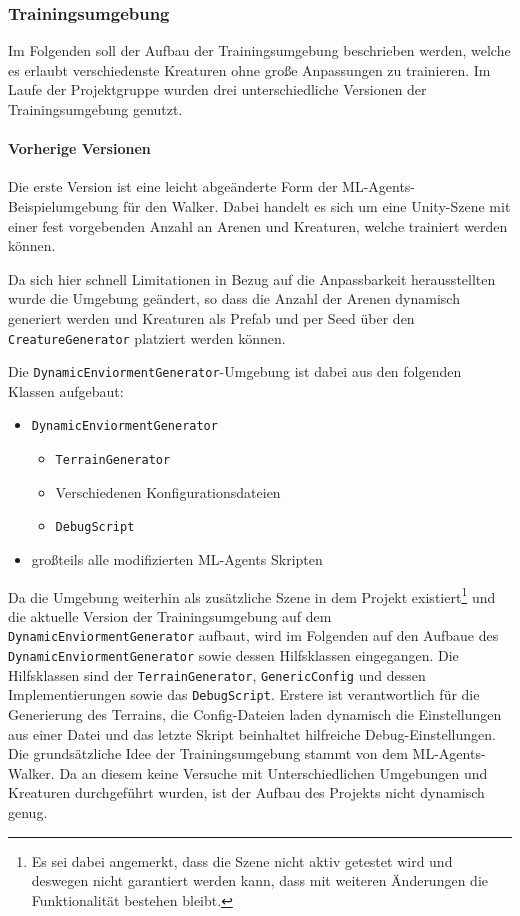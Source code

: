 \subsubsection{Trainingsumgebung}
Im Folgenden soll der Aufbau der Trainingsumgebung beschrieben werden, welche es erlaubt verschiedenste Kreaturen ohne große Anpassungen zu trainieren. Im Laufe der Projektgruppe wurden drei unterschiedliche Versionen der Trainingsumgebung genutzt. 

\paragraph{Vorherige Versionen}
Die erste Version ist eine leicht abgeänderte Form der ML-Agents-Beispielumgebung für den Walker. Dabei handelt es sich um eine Unity-Szene mit einer fest vorgebenden Anzahl an Arenen und Kreaturen, welche trainiert werden können.

Da sich hier schnell Limitationen in Bezug auf die Anpassbarkeit herausstellten wurde die Umgebung geändert, so dass die Anzahl der Arenen dynamisch generiert werden und Kreaturen als Prefab und per Seed über den \texttt{CreatureGenerator} platziert werden können. 

Die  \texttt{DynamicEnviormentGenerator}-Umgebung ist dabei aus den folgenden Klassen aufgebaut:

\begin{itemize}
	\item \texttt{DynamicEnviormentGenerator}
	\begin{itemize}
		\item \texttt{TerrainGenerator} %
		\item Verschiedenen Konfigurationsdateien
		\item \texttt{DebugScript}
	\end{itemize}
	\item großteils alle modifizierten ML-Agents Skripten
\end{itemize} 

Da die Umgebung weiterhin als zusätzliche Szene in dem Projekt existiert\footnote{Es sei dabei angemerkt, dass die Szene nicht aktiv getestet wird und deswegen nicht garantiert werden kann, dass mit weiteren Änderungen die Funktionalität bestehen bleibt.} und die aktuelle Version der Trainingsumgebung auf dem \texttt{DynamicEnviormentGenerator} aufbaut, wird im Folgenden auf den Aufbaue des \texttt{DynamicEnviormentGenerator} sowie dessen Hilfsklassen eingegangen. Die Hilfsklassen sind der \texttt{TerrainGenerator}, \texttt{GenericConfig} und dessen Implementierungen sowie das \texttt{DebugScript}. Erstere ist verantwortlich für die Generierung des Terrains, die Config-Dateien laden dynamisch die Einstellungen aus einer Datei und das letzte Skript beinhaltet hilfreiche Debug-Einstellungen. Die grundsätzliche Idee der Trainingsumgebung stammt von dem ML-Agents-Walker. Da an diesem keine Versuche mit Unterschiedlichen Umgebungen und Kreaturen durchgeführt wurden, ist der Aufbau des Projekts nicht dynamisch genug. 


